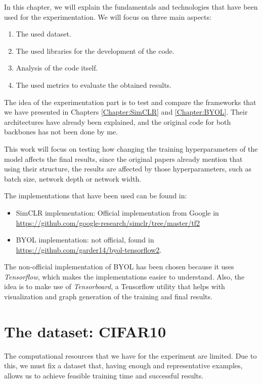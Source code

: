 In this chapter, we will explain the fundamentals and technologies that have been used for the experimentation. We will focus on three main aspects:
\begin{enumerate}
\item The used dataset.
\item The used libraries for the development of the code.
\item Analysis of the code itself.
\item The used metrics to evaluate the obtained results.
\end{enumerate}

The idea of the experimentation part is to test and compare the frameworks that we have presented in Chapters \ref{Chapter:SimCLR} and \ref{Chapter:BYOL}. Their architectures have already been explained, and the original code for both backbones has not been done by me. 

This work will focus on testing how changing the training hyperparameters of the model affects the final results, since the original papers \cite{chen_simple_2020,grill2020bootstrap} already mention that using their structure, the results are affected by those hyperparameters, such as batch size, network depth or network width.

The implementations that have been used can be found in:
\begin{itemize}
\item SimCLR implementation: Official implementation from Google in \url{https://github.com/google-research/simclr/tree/master/tf2}

\item BYOL implementation: not official, found in \url{https://github.com/garder14/byol-tensorflow2}. 
\end{itemize}

The non-official implementation of BYOL has been chosen because it uses \emph{Tensorflow}, which makes the implementations easier to understand. Also, the idea is to make use of \emph{Tensorboard}, a Tensorflow utility that helps with visualization and graph generation of the training and final results.


\section{The dataset: CIFAR10}

The computational resources that we have for the experiment are limited. Due to this, we must fix a dataset that, having enough and representative examples, allows us to achieve feasible training time and successful results.

